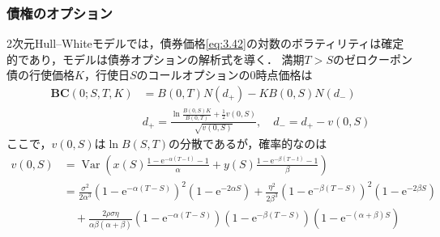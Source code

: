 \documentclass[a4paper, lualatex, ja=standard]{bxjsarticle}
\theoremstyle{theorem}
\theoremstyle{definition}
\theoremstyle{definition}
\newcommand{\BC}{\mathbf{BC}}
\begin{document}
\subsubsection{債権のオプション}
2次元Hull--Whiteモデルでは，債券価格\eqref{eq:3.42}の対数のボラティリティは確定的であり，モデルは債券オプションの解析式を導く．
満期$T>S$のゼロクーポン債の行使価格$K$，行使日$S$のコールオプションの$0$時点価格は
\begin{align*}
  \BC(0;S,T,K) &= B(0,T)N(d_{+}) - KB(0,S)N(d_{-}) \\
  &d_{+}=\frac{\ln \frac{B(0, S) K}{B(0, T)}+\frac{1}{2} v(0, S)}{\sqrt{v(0, S)}}, \quad d_{-}=d_{+}-v(0, S)
\end{align*}
ここで，$v(0,S)$は$\ln B(S,T)$の分散であるが，確率的なのは
\begin{align*}
  v(0, S) &=  \operatorname{Var}(x(S)\frac{1-\mathrm{e}^{-\alpha(T-t)}-1}{\alpha}+y(S)\frac{1-\mathrm{e}^{-\beta(T-t)}-1}{\beta}) \\
  &= \frac{\sigma^2}{2 \alpha^3}\left(1-\mathrm{e}^{-\alpha(T-S)}\right)^2\left(1-\mathrm{e}^{-2 \alpha S}\right)+\frac{\eta^2}{2 \beta^3}\left(1-\mathrm{e}^{-\beta(T-S)}\right)^2\left(1-\mathrm{e}^{-2 \beta S}\right) \\
  &\quad +\frac{2 \rho \sigma \eta}{\alpha \beta(\alpha+\beta)}\left(1-\mathrm{e}^{-\alpha(T-S)}\right)\left(1-\mathrm{e}^{-\beta(T-S)}\right)\left(1-\mathrm{e}^{-(\alpha+\beta) S}\right)
\end{align*}
\end{document}
